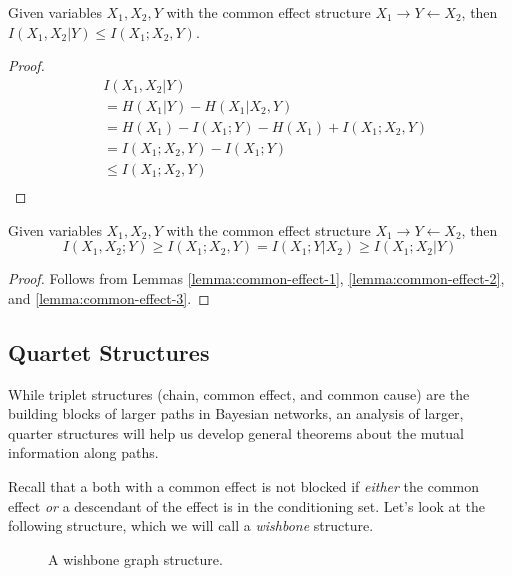 \documentclass[../thesis.tex]{subfiles}
\begin{document}
\begin{lem}
  \label{lemma:common-effect-3}
  Given variables $X_1,X_2,Y$ with
  the common effect structure $X_1 \rightarrow Y \leftarrow X_2$,
  then $I(X_1,X_2 \vert Y) \leq I(X_1;X_2,Y)$.
\end{lem}
\begin{proof}
  \begin{equation}
    \begin{split}
      & I(X_1,X_2 \vert Y) \\
      & = H(X_1 \vert Y) - H(X_1 \vert X_2, Y) \\
      & = H(X_1) - I(X_1;Y) - H(X_1) + I(X_1;X_2,Y)\\
      & = I(X_1;X_2,Y) - I(X_1;Y) \\
      & \leq I(X_1;X_2,Y) \\
    \end{split}
  \end{equation}
\end{proof}

\begin{thm}
  \label{thm:common-effect-inequality}
  Given variables $X_1,X_2,Y$ with
  the common effect structure $X_1 \rightarrow Y \leftarrow X_2$, then
  $$I(X_1,X_2 ; Y) \geq I(X_1;X_2,Y) = I(X_1 ; Y \vert X_2) \geq I(X_1;X_2 \vert Y)$$
\end{thm}
\begin{proof}
  Follows from Lemmas \ref{lemma:common-effect-1},
  \ref{lemma:common-effect-2}, and \ref{lemma:common-effect-3}.
\end{proof}


\subsection{Quartet Structures}

While triplet structures (chain, common effect, and common cause)
are the building blocks of larger paths in Bayesian networks,
an analysis of larger, quarter structures will help us develop
general theorems about the mutual information along paths.

Recall that a both with a common effect is not blocked
if \emph{either} the common effect \emph{or} a descendant of
the effect is in the conditioning set.
Let's look at the following structure,
which we will call a \emph{wishbone} structure.

\begin{figure}
\begin{center}
\end{center}
\caption{A wishbone graph structure.}
\end{figure}
\end{document}
